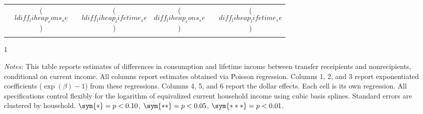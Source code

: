 \begin{table}[h!]
\begin{tabular*}{1.36\textwidth}{@{\extracolsep{\fill}}lcccccc}
                   & ($$ldiff_liheap_cons_se$$) &  & ($$ldiff_liheap_lifetime_se$$)   & ($$diff_liheap_cons_se$$)                 &           & ($$diff_liheap_lifetime_se$$)                 \\ \addlinespace \bottomrule   
                \end{tabular*}
                \begin{spacing}{1}
                    \begin{tablenotes}
                          \item \footnotesize \textit{Notes:} This table reports estimates of differences in consumption and lifetime income between transfer receipients and nonrecipients, conditional on current income. All columns report estimates obtained via Poisson regression. Columns 1, 2, and 3 report exponentiated coefficients ($\exp(\beta)-1$) from these regressions. Columns 4, 5, and 6 report the dollar effects. Each cell is its own regression. All specifications control flexibly for the logarithm of equivalized current household income using cubic basis splines. Standard errors are clustered by household. $\sym{*} = p < 0.10$, $\sym{**} = p < 0.05$, $\sym{***} = p < 0.01$.
                          \end{tablenotes}
                           \end{spacing}
                    \end{table}